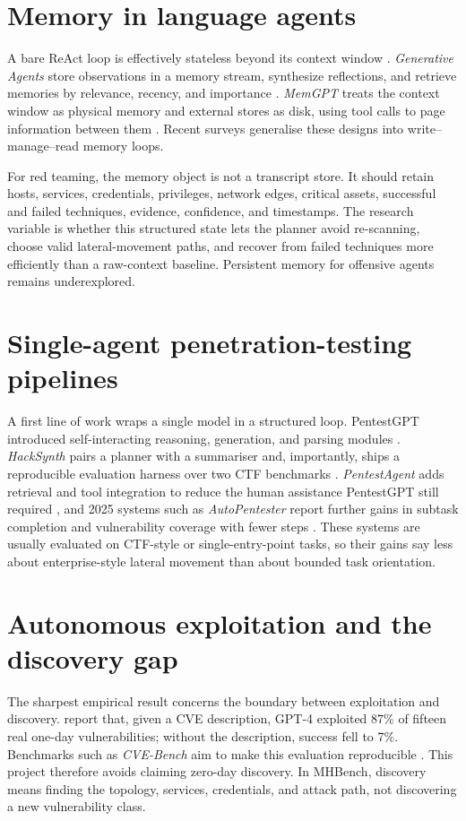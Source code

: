 \documentclass[12pt,oneside]{report}
\begin{document}
\section[Memory in language agents]{Memory in language agents}
\label{sec:memory}
A bare ReAct loop is effectively stateless beyond its context window
\citep{zhang2024memorysurvey}. \emph{Generative Agents} store observations in a
memory stream, synthesize reflections, and retrieve memories by relevance,
recency, and importance \citep{park2023generative}. \emph{MemGPT} treats the
context window as physical memory and external stores as disk, using tool calls
to page information between them \citep{packer2023memgpt}. Recent surveys
generalise these designs into write--manage--read memory loops.

For red teaming, the memory object is not a transcript store. It should retain
hosts, services, credentials, privileges, network edges, critical assets,
successful and failed techniques, evidence, confidence, and timestamps. The
research variable is whether this structured state lets the planner avoid
re-scanning, choose valid lateral-movement paths, and recover from failed
techniques more efficiently than a raw-context baseline. Persistent memory for
offensive agents remains underexplored.

\section[Single-agent pipelines]{Single-agent penetration-testing pipelines}
A first line of work wraps a single model in a structured loop. PentestGPT
introduced self-interacting reasoning, generation, and parsing modules
\citep{deng2023pentestgpt}. \emph{HackSynth} pairs a planner with a summariser
and, importantly, ships a reproducible evaluation harness over two
CTF benchmarks \citep{muzsai2024hacksynth}. \emph{PentestAgent} adds retrieval
and tool integration to reduce the human assistance PentestGPT still required
\citep{shen2024pentestagent}, and 2025 systems such as \emph{AutoPentester}
report further gains in subtask completion and vulnerability coverage with fewer
steps \citep{autopentester2025}. These systems are usually evaluated on
CTF-style or single-entry-point tasks, so their gains say less about
enterprise-style lateral movement than about bounded task orientation.

\section[Exploitation and the discovery gap]{Autonomous exploitation and the discovery gap}
The sharpest empirical result concerns the boundary between exploitation and
discovery. \citet{fang2024oneday} report that, given a CVE description, GPT-4
exploited 87\% of fifteen real one-day vulnerabilities; without the description,
success fell to 7\%. Benchmarks such as \emph{CVE-Bench} aim to make this
evaluation reproducible \citep{cvebench2025}. This project therefore avoids
claiming zero-day discovery. In MHBench, discovery means finding the topology,
services, credentials, and attack path, not discovering a new vulnerability
class.
\end{document}
